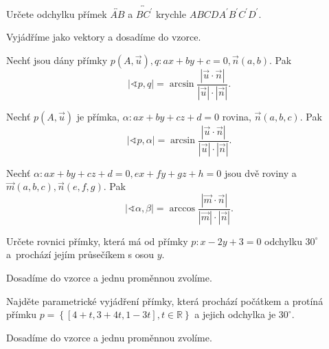 \begin{priklad}
Určete odchylku přímek $\overleftrightarrow{AB}$ a $\overleftrightarrow{BC^\prime}$
krychle $ABCDA^\prime B^\prime C^\prime D^\prime$.
\end{priklad}

\begin{reseni}
Vyjádříme jako vektory a dosadíme do vzorce.
\end{reseni}

\begin{veta}
Nechť jsou dány přímky $p(A,\vec u), q:ax+by+c=0, \vec n(a,b).$ Pak
$$|\sphericalangle p, q|=\arcsin \frac{|\vec u \cdot \vec n|}{|\vec u|\cdot |\vec n|}.$$
\end{veta}

\begin{veta}
    Nechť $p(A,\vec u)$ je přímka, $\alpha:ax+by+cz+d=0$ rovina, $\vec n(a,b,c)$. Pak
    $$|\sphericalangle p, \alpha|=\arcsin \frac{|\vec u \cdot \vec n|}{|\vec u|\cdot |\vec n|}.$$
\end{veta}

\begin{veta}
    Nechť $\alpha:ax+by+cz+d=0, ex+fy+gz+h=0$ jsou dvě roviny a~$\vec m(a,b,c), \vec n(e,f,g).$
    Pak
    $$|\sphericalangle \alpha, \beta|=\arccos \frac{|\vec m \cdot \vec n|}{|\vec m|\cdot |\vec n|}.$$
\end{veta}

\begin{priklad}
Určete rovnici přímky, která má od přímky $p:x-2y+3=0$ odchylku $30^\circ$ a~prochází
jejím průsečíkem s osou $y$.
\end{priklad}

\begin{reseni}
Dosadíme do vzorce a jednu proměnnou zvolíme.
\end{reseni}

\begin{priklad}
Najděte parametrické vyjádření přímky, která prochází počátkem a protíná přímku $p=\left \{ [4+t,3+4t,1-3t],t\in \mathbb R \right \} $
a jejich odchylka je $30^\circ$.
\end{priklad}

\begin{reseni}
Dosadíme do vzorce a jednu proměnnou zvolíme.
\end{reseni}
